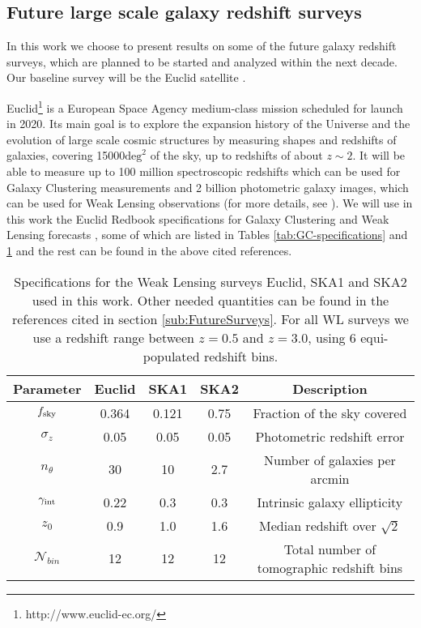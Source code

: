 \subsection{Future large scale galaxy redshift surveys \label{sub:FutureSurveys}}

In this work we choose to present results on some of the future galaxy redshift surveys, which are planned to be started and analyzed within the next decade.
Our baseline survey will be the Euclid satellite \cite{amendola_cosmology_2013, laureijs_euclid_2011}. 

Euclid\footnote{http://www.euclid-ec.org/} is a European Space Agency medium-class mission scheduled for launch in 2020. 
Its main goal is to explore the expansion history of the Universe and the evolution of large scale cosmic structures by measuring shapes and redshifts of galaxies, covering 15000$\text{deg}^2$ of the sky, up to redshifts of about $z\sim2$. 
It will be able to measure up to 100 million spectroscopic redshifts which can be used for Galaxy Clustering measurements and 2 billion photometric galaxy images, which can be used for Weak Lensing observations (for more details, see \cite{amendola_cosmology_2013, laureijs_euclid_2011}). 
We will use in this work the  Euclid Redbook specifications for Galaxy Clustering and Weak Lensing forecasts \cite{laureijs_euclid_2011}, 
some of which are listed in Tables \ref{tab:GC-specifications} and \ref{tab:WL-specifications} and the rest can be found in the above cited references.

\begin{table}[h]
	\centering{}
	\begin{tabular}{|c|ccc|c|}
		\hline 
		\Tstrut \textbf{Parameter}  & \textbf{Euclid}  & \textbf{SKA1}  & \textbf{SKA2}  &
		\textbf{Description}\tabularnewline
		\hline 
		\Tstrut $f_{\rm sky}$  & 0.364  & 0.121  & 0.75 & Fraction of the sky covered\tabularnewline
		$\sigma_{z}$  & 0.05  & 0.05  & 0.05  & Photometric redshift
		error\tabularnewline
		$n_{\theta}$  & 30  & 10  & 2.7  & Number of galaxies per arcmin\tabularnewline 
		$\gamma_{\rm int}$  & 0.22  & 0.3  & 0.3  & Intrinsic galaxy ellipticity \tabularnewline
		$z_{0}$  & 0.9  & 1.0  & 1.6  & Median redshift over $\sqrt{2}$ \tabularnewline
		$\mathcal{N}_{bin}$ & 12 & 12 & 12 & Total number of tomographic redshift bins
		\tabularnewline
		\hline 
	\end{tabular}\caption[Specifications for future WL surveys.]{\label{tab:WL-specifications} Specifications for
		the Weak Lensing
		surveys Euclid, SKA1 and SKA2 used in this work. Other needed quantities can be found in the references cited in section \ref{sub:FutureSurveys}.
		For all WL surveys we use a redshift range between $z=0.5$ and $z=3.0$, using 6 equi-populated redshift bins.}
\end{table}

